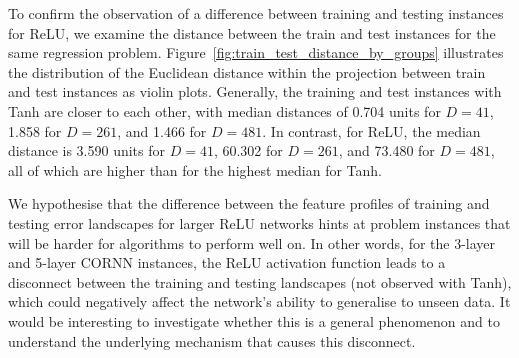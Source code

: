 \documentclass[acmsmall,screen,review,anonymous]{acmart}
\begin{document}

To confirm the observation of a difference between training and testing instances for ReLU, we examine the distance between the train and test instances for the same regression problem. Figure~\ref{fig:train_test_distance_by_groups} illustrates the distribution of the Euclidean distance within the projection between train and test instances as violin plots. Generally, the training and test instances with Tanh are closer to each other, with median distances of 0.704 units for $D=41$, 1.858 for $D=261$, and 1.466 for $D=481$. In contrast, for ReLU, the median distance is 3.590 units for $D=41$, 60.302 for $D=261$, and 73.480 for $D=481$, all of which are higher than for the highest median for Tanh. %

We hypothesise that the difference between the feature profiles of training and testing error landscapes for larger ReLU networks hints at problem instances that will be harder for algorithms to perform well on. In other words, for the 3-layer and 5-layer CORNN instances, the ReLU activation function leads to a disconnect between the training and testing landscapes (not observed with Tanh), which could negatively affect the network's ability to generalise to unseen data. It would be interesting to investigate whether this is a general phenomenon and to understand the underlying mechanism that causes this disconnect. %


\end{document}
